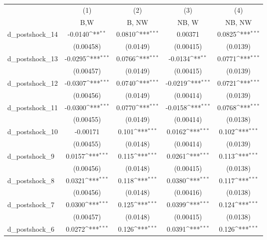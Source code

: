 {
\def\sym#1{\ifmmode^{#1}\else\(^{#1}\)\fi}
\begin{tabular}{l*{4}{c}}
\hline\hline
          &\multicolumn{1}{c}{(1)}&\multicolumn{1}{c}{(2)}&\multicolumn{1}{c}{(3)}&\multicolumn{1}{c}{(4)}\\
          &\multicolumn{1}{c}{B,W}&\multicolumn{1}{c}{B, NW}&\multicolumn{1}{c}{NB, W}&\multicolumn{1}{c}{NB, NW}\\
\hline
d\_postshock\_14&  -0.0140\sym{**} &   0.0810\sym{***}&  0.00371         &   0.0825\sym{***}\\
          &(0.00458)         & (0.0149)         &(0.00415)         & (0.0139)         \\
d\_postshock\_13&  -0.0295\sym{***}&   0.0766\sym{***}&  -0.0134\sym{**} &   0.0771\sym{***}\\
          &(0.00457)         & (0.0149)         &(0.00415)         & (0.0139)         \\
d\_postshock\_12&  -0.0307\sym{***}&   0.0740\sym{***}&  -0.0219\sym{***}&   0.0721\sym{***}\\
          &(0.00456)         & (0.0149)         &(0.00414)         & (0.0139)         \\
d\_postshock\_11&  -0.0300\sym{***}&   0.0770\sym{***}&  -0.0158\sym{***}&   0.0768\sym{***}\\
          &(0.00455)         & (0.0149)         &(0.00414)         & (0.0138)         \\
d\_postshock\_10& -0.00171         &    0.101\sym{***}&   0.0162\sym{***}&    0.102\sym{***}\\
          &(0.00455)         & (0.0148)         &(0.00414)         & (0.0139)         \\
d\_postshock\_9&   0.0157\sym{***}&    0.115\sym{***}&   0.0261\sym{***}&    0.113\sym{***}\\
          &(0.00456)         & (0.0148)         &(0.00415)         & (0.0138)         \\
d\_postshock\_8&   0.0321\sym{***}&    0.118\sym{***}&   0.0380\sym{***}&    0.117\sym{***}\\
          &(0.00456)         & (0.0148)         &(0.00416)         & (0.0138)         \\
d\_postshock\_7&   0.0300\sym{***}&    0.125\sym{***}&   0.0399\sym{***}&    0.124\sym{***}\\
          &(0.00457)         & (0.0148)         &(0.00415)         & (0.0138)         \\
d\_postshock\_6&   0.0272\sym{***}&    0.126\sym{***}&   0.0391\sym{***}&    0.126\sym{***}\\

\end{tabular}}
